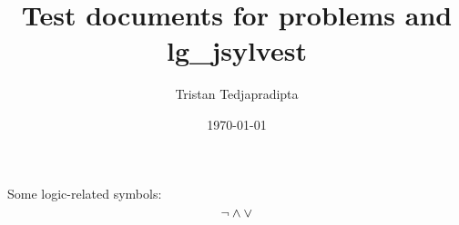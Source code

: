 \documentclass[a4paper]{article}
\title{Test documents for problems and lg\_jsylvest}
\author{Tristan Tedjapradipta}
\date{\today}
\begin{document}
    Some logic-related symbols:
    \begin{equation}
        \neg \wedge \vee
    \end{equation}
\end{document}
